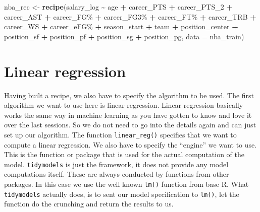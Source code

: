 \documentclass[
]{book}
\newenvironment{Shaded}{\begin{snugshade}}{\end{snugshade}}
\newcommand{\AttributeTok}[1]{\textcolor[rgb]{0.13,0.29,0.53}{#1}}
\newcommand{\FunctionTok}[1]{\textcolor[rgb]{0.13,0.29,0.53}{\textbf{#1}}}
\newcommand{\NormalTok}[1]{#1}
\newcommand{\OtherTok}[1]{\textcolor[rgb]{0.56,0.35,0.01}{#1}}
\newcommand{\SpecialCharTok}[1]{\textcolor[rgb]{0.81,0.36,0.00}{\textbf{#1}}}
\newcommand{\StringTok}[1]{\textcolor[rgb]{0.31,0.60,0.02}{#1}}
\begin{document}
\begin{Shaded}
\begin{Highlighting}[]
\NormalTok{nba\_rec }\OtherTok{\textless{}{-}} \FunctionTok{recipe}\NormalTok{(salary\_log }\SpecialCharTok{\textasciitilde{}}\NormalTok{ age }\SpecialCharTok{+}\NormalTok{ career\_PTS }\SpecialCharTok{+}\NormalTok{ career\_PTS\_2 }\SpecialCharTok{+} 
\NormalTok{                    career\_AST }\SpecialCharTok{+} \StringTok{\textasciigrave{}}\AttributeTok{career\_FG\%}\StringTok{\textasciigrave{}} \SpecialCharTok{+} \StringTok{\textasciigrave{}}\AttributeTok{career\_FG3\%}\StringTok{\textasciigrave{}} \SpecialCharTok{+} \StringTok{\textasciigrave{}}\AttributeTok{career\_FT\%}\StringTok{\textasciigrave{}} \SpecialCharTok{+}
\NormalTok{                    career\_TRB }\SpecialCharTok{+}\NormalTok{ career\_WS }\SpecialCharTok{+} \StringTok{\textasciigrave{}}\AttributeTok{career\_eFG\%}\StringTok{\textasciigrave{}} \SpecialCharTok{+}
\NormalTok{                    season\_start }\SpecialCharTok{+}\NormalTok{ team }\SpecialCharTok{+}
\NormalTok{                    position\_center }\SpecialCharTok{+}\NormalTok{ position\_sf }\SpecialCharTok{+}\NormalTok{ position\_pf }\SpecialCharTok{+}\NormalTok{ position\_sg }\SpecialCharTok{+}\NormalTok{ position\_pg,}
                  \AttributeTok{data =}\NormalTok{ nba\_train)}
\end{Highlighting}
\end{Shaded}

\hypertarget{linear-regression}{%
\section{Linear regression}\label{linear-regression}}

Having built a recipe, we also have to specify the algorithm to be used.
The first algorithm we want to use here is linear regression. Linear regression
basically works the same way in machine learning as you have gotten to know and
love it over the last sessions. So we do not need to go into the details again
and can just set up our algorithm.
The function \texttt{linear\_reg()} specifies that we want to
compute a linear regression. We also have to specify the ``engine'' we want to
use. This is the function or package that is used for the actual computation of
the model.
\texttt{tidymodels} is just the framework, it does not provide any model computations
itself. These are always conducted by functions from other packages. In this
case we use the well known \texttt{lm()} function from base R. What \texttt{tidymodels}
actually does, is to sent our model specification to \texttt{lm()}, let the function do
the crunching and return the results to us.
\end{document}
